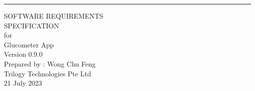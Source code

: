 \documentclass[a4paper]{scrreprt}
\date{}
\def\myversion{0.9.0}
\begin{document}
\thispagestyle{currentpagefooter}

\begin{flushright}
    \rule{16cm}{5pt}\vskip2cm
    \begin{bfseries}
        \Huge{SOFTWARE REQUIREMENTS\\ SPECIFICATION}\\
        \vspace{3.5cm}
        for\\
        \vspace{1.5cm}
        Glucometer App\\
        \vspace{3.2cm}
        \LARGE{Version \myversion}\\
        \vspace{1.5cm}
        Prepared by : Wong Chu Feng\\
        \vspace{1.5cm}
        Trilogy Technologies Pte Ltd\\
        \vspace{1.5cm}
        21 July 2023\\
    \end{bfseries}
\end{flushright}
\clearpage
\end{document}

